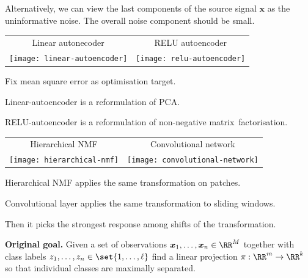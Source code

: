 \documentclass[landscape,footrule]{foils}
\renewcommand{\vec}[1]{\boldsymbol{#1}}
\newcommand{\lastline}{\vspace*{-2ex}}
\begin{document}
Alternatively, we can view the last components of the source signal $\vec{x}$ as the uninformative noise. The overall noise component should be small.\lastline


\begin{tabular}{cc}
Linear autonecoder & RELU autoencoder\\

\texttt{[image: linear-autoencoder]}
&\texttt{[image: relu-autoencoder]}\\
\end{tabular}

Fix mean square error as optimisation target. %
\begin{triangles}
\item Linear-autoencoder is a reformulation of PCA.  
\item RELU-autoencoder is a reformulation of non-negative matrix~factorisation.
\end{triangles}




\begin{tabular}{cc}
Hierarchical NMF & Convolutional network\\

\texttt{[image: hierarchical-nmf]}
&\texttt{[image: convolutional-network]}\\
\end{tabular}

\begin{triangles}
\item Hierarchical NMF applies the same transformation on patches.
\item Convolutional layer applies the same transformation to sliding windows.
\item Then it picks the strongest response among shifts of the transformation.
\end{triangles}





\textbf{Original goal.}
Given a set of observations $\vec{x}_1,\ldots,\vec{x}_n\in\RR^M$ together with class labels $z_1,\ldots,z_n\in\set{1,\ldots,\ell}$ find a linear projection $\pi:\RR^m\to\RR^k$ so that individual classes are maximally separated.\vspace*{1cm}
\end{document}
